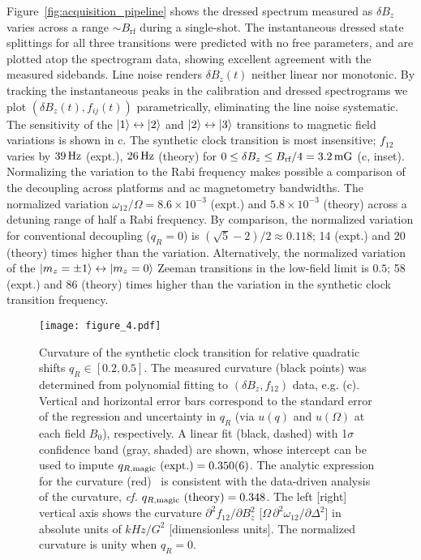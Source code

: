 \documentclass[aps,prl,reprint,superscriptaddress,floatfix]{revtex4-1}
\begin{document}
Figure~\ref{fig:acquisition_pipeline} shows the dressed spectrum measured as $\delta B_z$ varies across a range $\sim B_{\text{rf}}$ during a single-shot.
The instantaneous dressed state splittings for all three transitions were predicted with no free parameters, and are plotted atop the spectrogram data, showing excellent agreement with the measured sidebands.
Line noise renders $\delta B_z(t)$ neither linear nor monotonic.
By tracking the instantaneous peaks in the calibration and dressed spectrograms we plot $(\delta B_z(t), f_{ij}(t))$ parametrically, eliminating the line noise systematic.
The sensitivity of the $\vert 1 \rangle  \leftrightarrow \vert 2 \rangle $ and $\vert 2 \rangle  \leftrightarrow \vert 3 \rangle $ transitions to magnetic field variations is shown in c.
The synthetic clock transition is most insensitive; $f_{12}$ varies by $\unit[39]{Hz}$ (expt.), $\unit[26]{Hz}$ (theory) for $0 \leq \delta B_z \leq B_{\text{rf}}/4 = \unit[3.2]{mG}$ (c, inset).
Normalizing the variation to the Rabi frequency makes possible a comparison of the decoupling across platforms and ac magnetometry bandwidths. 
The normalized variation $\omega_{12}/\Omega = 8.6\times10^{-3}$ (expt.) and $5.8\times10^{-3}$ (theory) across a detuning range of half a Rabi frequency.
By comparison, the normalized variation for conventional decoupling ($q_R=0$) is $(\sqrt{5}-2)/2 \approx 0.118$; 14 (expt.) and 20 (theory) times higher than the variation.
Alternatively, the normalized variation of the $\vert m_z=\pm1 \rangle  \leftrightarrow \vert m_z = 0 \rangle $ Zeeman transitions in the low-field limit is $0.5$; 58 (expt.) and 86 (theory) times higher than the variation in the synthetic clock transition frequency.

\begin{figure}
    \texttt{[image: figure\_4.pdf]}
    \caption{
    \label{fig:curvature_vs_qR}
        Curvature of the synthetic clock transition for relative quadratic shifts $q_R \in [0.2, 0.5]$.
        The measured curvature (black points) was determined from polynomial fitting to $(\delta B_z, f_{12})$ data, e.g. (c).
        Vertical and horizontal error bars correspond to the standard error of the regression and uncertainty in $q_R$ (via $u(q)$ and $u(\Omega)$ at each field $B_0$), respectively.
        A linear fit (black, dashed) with 1$\sigma$ confidence band (gray, shaded) are shown, whose intercept can be used to impute $q_{R,\text{magic}}\text{ (expt.)} = 0.350(6)$.
        The analytic expression for the curvature (red)~\cite{Note1} is consistent with the data-driven analysis of the curvature, \textit{cf.} $q_{R,\text{magic}}\text{ (theory)} = 0.348$.
        The left [right] vertical axis shows the curvature $\partial^2 f_{12}/\partial B_z^2$ [$\Omega\, \partial^2\omega_{12}/\partial \Delta^2$] in absolute units of $\unit{kHz/G^2}$ [dimensionless units].
        The normalized curvature is unity when $q_R=0$.
    }
\end{figure}
 
\end{document}
